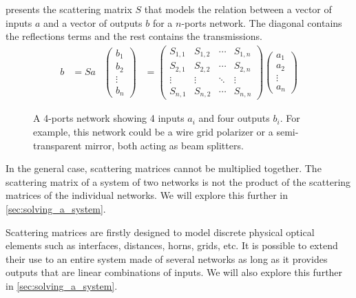  presents the scattering matrix $S$ that models the relation between a vector of inputs $a$ and a vector of outputs $b$ for a $n$-ports network.
The diagonal contains the reflections terms and the rest contains the transmissions.
\begin{align}
    b &= S a
    &
    \begin{pmatrix}
        b_1\\
        b_2\\
        \vdots\\
        b_n
    \end{pmatrix}
    &=
    \begin{pmatrix}
        S_{1, 1} & S_{1, 2} & \cdots & S_{1, n} \\
        S_{2, 1} & S_{2, 2} & \cdots & S_{2, n} \\
        \vdots   & \vdots   & \ddots & \vdots   \\
        S_{n, 1} & S_{n, 2} & \cdots & S_{n, n}
    \end{pmatrix}
    \begin{pmatrix}
        a_1\\
        a_2\\
        \vdots\\
        a_n
    \end{pmatrix}
    \label{eq:scattering_matrix}
\end{align}

\begin{figure}[hbtp]
    \centering
    
    \caption{A 4-ports network showing 4 inputs $a_i$ and four outputs $b_i$.  For example, this network could be a wire grid polarizer or a semi-transparent mirror, both acting as beam splitters.}%
    \label{fig:scattering_matrix_notations}
\end{figure}

In the general case, scattering matrices cannot be multiplied together.
The scattering matrix of a system of two networks is not the product of the scattering matrices of the individual networks.
We will explore this further in \cref{sec:solving_a_system}.

Scattering matrices are firstly designed to model discrete physical optical elements such as interfaces, distances, horns, grids, etc.
It is possible to extend their use to an entire system made of several networks as long as it provides outputs that are linear combinations of inputs.
We will also explore this further in \cref{sec:solving_a_system}.



